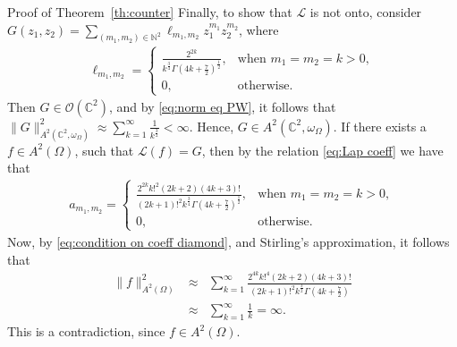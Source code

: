 \documentclass[11pt, oneside, reqno]{amsart}
\numberwithin{equation}{section}
\theoremstyle{definition}
\newcommand{\beas}{\begin{eqnarray*}}
\newcommand{\eeas}{\end{eqnarray*}}
\newcommand{\hol}{\mathcal {O}}
\newcommand{\C}{\mathbb C}
\newcommand{\N}{\mathbb N}
\newcommand{\ltt}{\left(}
\newcommand{\rtt}{\right)}
\newcommand{\Om}{\Omega}
\begin{document}
{\begin{section}{Proof of Theorem~\ref{th:counter}}
    Finally, to show that $\mathcal L$ is not onto, consider $G(z_1,z_2)=\sum\limits_{(m_1,m_2)\in\N^2}\ell_{m_1,m_2}z_1^{m_1}z_2^{m_2}$, where
    \beas
    \ell_{m_1,m_2}=\begin{cases}
        \frac{2^{2k}}{k^{\frac{3}{4}} \Gamma\ltt 4k+\frac{7}{2}\rtt^{\frac{1}{2}}},& \text{when } m_1=m_2=k>0,\\
          0,&\text{otherwise}.
      \end{cases} 
    \eeas
    Then $G\in\hol(\C^2)$, and by \eqref{eq:norm eq PW}, it follows that
    $\|G\|_{A^2(\C^2,\omega_\Om)}^2\approx \sum\limits_{k=1}^\infty \frac{1}{k^\frac{3}{2}}<\infty.$ Hence, $G\in A^2(\C^2,\omega_\Om)$. If there exists a $f\in A^2(\Om)$, such that $\mathcal L(f)=G$, then by the relation \eqref{eq:Lap coeff} we have that
\beas
 a_{m_1,m_2}=\begin{cases}
        \frac{2^{2k} k!^2(2k+2)(4k+3)!}{(2k+1)!^2k^{\frac{3}{4}} \Gamma\ltt 4k+\frac{7}{2}\rtt^{\frac{1}{2}}},& \text{when } m_1=m_2=k>0,\\
          0,&\text{otherwise}.
      \end{cases} 
\eeas
Now, by \eqref{eq:condition on coeff diamond}, and Stirling's approximation, it follows that
\beas
\|f\|^2_{A^2(\Om)}&\approx&\sum\limits_{k=1}^\infty \frac{2^{4k} k!^4(2k+2)(4k+3)!}{(2k+1)!^2k^{\frac{3}{2}} \Gamma\ltt 4k+\frac{7}{2}\rtt}\\
&\approx& \sum\limits_{k=1}^\infty \frac{1}{k}=\infty.
\eeas
This is a contradiction, since $f\in A^2(\Om)$.


\end{section}}
\end{document}

